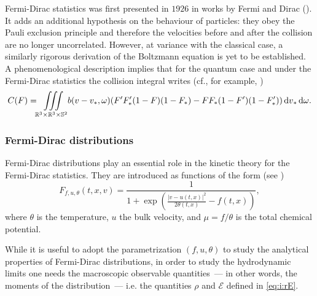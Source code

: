 Fermi-Dirac statistics was first presented in $1926$  in works by   Fermi and   Dirac (\cite{fermi1926quantelung,dirac1926Quantum}). It adds an additional hypothesis on the behaviour of particles: they obey the Pauli exclusion principle and therefore the velocities before and after the collision are no longer uncorrelated. However, at variance with the classical case, a similarly rigorous derivation of the Boltzmann equation is yet to be established. A phenomenological description implies that for the quantum case and under the Fermi-Dirac statistics the collision integral writes (cf., for example, \cite{Landau1968Course})
\begin{equation}\label{eq:i:CF}
	C (F)={\iiint\limits_{\mathbb R^3\times\mathbb R^3\times\mathbb S^2}} b(v-v_*,\omega)(F'F'_*(1-F)(1-F_*)-FF_*(1-F')(1-F'_*)){\,\mathrm{d} v}_*{\,\mathrm{d} \omega}.
\end{equation}


\subsubsection{Fermi-Dirac distributions} %
\label{ssub:fermi_dirac_distributions}

Fermi-Dirac distributions play an essential role in the kinetic theory for the Fermi-Dirac statistics. They are introduced as functions of the form (see \cite{reif2009fundamentals,Landau1968Course})
\begin{equation}
	\label{eq:i:fd}
	F_{f,u,\theta}(t,x,v)=\frac{1}{1+\exp\left(\frac{|v-u(t,x)|^2}{2 \theta(t,x) }
	-f(t,x)\right)},
\end{equation}
where $\theta$ is the temperature, $u$ the bulk velocity, and $\mu=f/\theta$ is the total chemical potential.  


While it is useful to adopt the parametrization $(f,u,\theta)$ to study the analytical properties of Fermi-Dirac distributions, in order to study the hydrodynamic limits one needs the macroscopic observable quantities~--- in other words, the moments of the distribution~--- i.e. the quantities $\rho$ and $\mathcal E$ defined in \eqref{eq:i:rE}.

